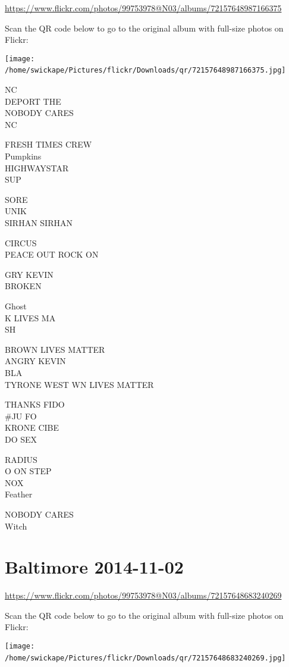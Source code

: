 \documentclass[10pt,letterpaper]{article}
\begin{document}
\url{https://www.flickr.com/photos/99753978@N03/albums/72157648987166375}

Scan the QR code below to go to the original album with full-size photos on Flickr:

\texttt{[image: /home/swickape/Pictures/flickr/Downloads/qr/72157648987166375.jpg]}
\

NC\\
DEPORT THE\\
NOBODY CARES\\
NC

FRESH TIMES CREW\\
Pumpkins\\
HIGHWAYSTAR\\
SUP

SORE\\
UNIK\\
SIRHAN SIRHAN

CIRCUS\\
PEACE OUT ROCK ON

GRY KEVIN\\
BROKEN

Ghost\\
K LIVES MA\\
SH

BROWN LIVES MATTER\\
ANGRY KEVIN\\
BLA\\
TYRONE WEST WN LIVES MATTER

THANKS FIDO\\
\#JU FO\\
KRONE CIBE\\
DO SEX

RADIUS\\
O ON STEP\\
NOX\\
Feather

NOBODY CARES\\
Witch
\

\section*{Baltimore 2014-11-02}

\url{https://www.flickr.com/photos/99753978@N03/albums/72157648683240269}

Scan the QR code below to go to the original album with full-size photos on Flickr:

\texttt{[image: /home/swickape/Pictures/flickr/Downloads/qr/72157648683240269.jpg]}
\
\end{document}
